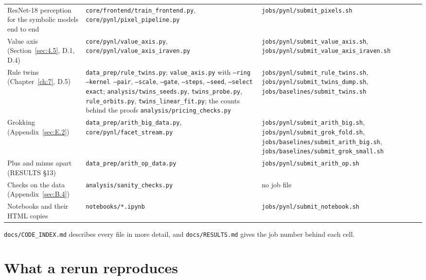 {\begin{xltabular}{\linewidth}{@{}YYY@{}}
ResNet-18 perception for the symbolic models end to end & \texttt{core/frontend/train\_frontend.py}, \texttt{core/pynl/pixel\_pipeline.py} & \texttt{jobs/pynl/submit\_pixels.sh} \\
Value axis (Section~\ref{sec:4.5}, D.1, D.4) & \texttt{core/pynl/value\_axis.py}, \texttt{core/pynl/value\_axis\_iraven.py} & \texttt{jobs/pynl/submit\_value\_axis.sh}, \texttt{jobs/pynl/submit\_value\_axis\_iraven.sh} \\
Rule twins (Chapter~\ref{ch:7}, D.5) & \texttt{data\_prep/rule\_twins.py}; \texttt{value\_axis.py} with \texttt{--ring --kernel --pair}, \texttt{--scale}, \texttt{--gate}, \texttt{--steps}, \texttt{--seed}, \texttt{--select exact}; \texttt{analysis/twins\_seeds.py}, \texttt{twins\_probe.py}, \texttt{rule\_orbits.py}, \texttt{twins\_linear\_fit.py}; the counts behind the proofs \texttt{analysis/pricing\_checks.py} & \texttt{jobs/pynl/submit\_rule\_twins.sh}, \texttt{jobs/pynl/submit\_twins\_dump.sh}, \texttt{jobs/baselines/submit\_twins.sh} \\
Grokking (Appendix~\ref{sec:E.2}) & \texttt{data\_prep/arith\_big\_data.py}, \texttt{core/pynl/facet\_stream.py} & \texttt{jobs/pynl/submit\_arith\_big.sh}, \texttt{jobs/pynl/submit\_grok\_fold.sh}, \texttt{jobs/baselines/submit\_arith\_big.sh}, \texttt{jobs/baselines/submit\_grok\_small.sh} \\
Plus and minus apart (RESULTS \S{}13) & \texttt{data\_prep/arith\_op\_data.py} & \texttt{jobs/pynl/submit\_arith\_op.sh} \\
Checks on the data (Appendix~\ref{sec:B.4}) & \texttt{analysis/sanity\_checks.py} & no job file \\
Notebooks and their HTML copies & \texttt{notebooks/*.ipynb} & \texttt{jobs/pynl/submit\_notebook.sh} \\
\bottomrule
\end{xltabular}}

\texttt{docs/CODE\_INDEX.md} describes every file in more detail, and \texttt{docs/RESULTS.md} gives the job number behind each cell.

\section{What a rerun reproduces}\label{sec:F.3}

